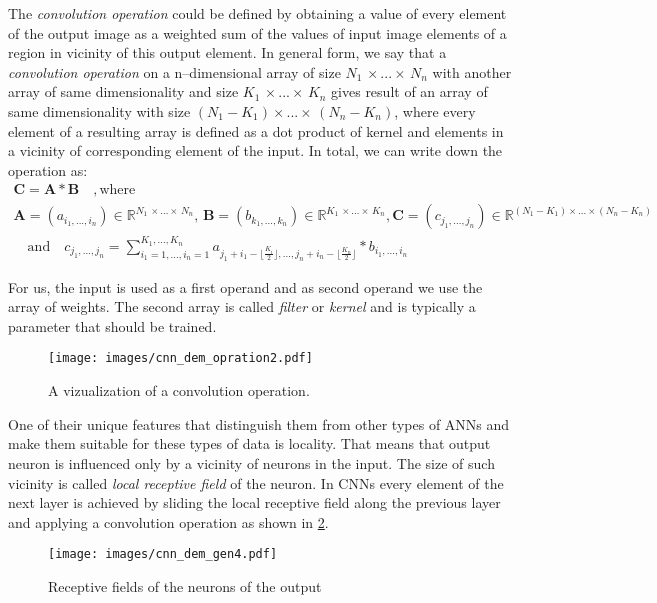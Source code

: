The \textit{convolution operation} could be defined by obtaining a value of every element of the output image as a weighted sum of the values of input image elements of a region in vicinity of this output element.
In general form, we say that a \emph{convolution operation} on a $\mathrm{n}$--dimensional array of size $N_{1} \, \times... \times \, N_{n}$ with another array of same dimensionality and size $K_{1} \, \times... \times \, K_{n} $ gives result of an array of same dimensionality with size $ (N_{1}-K_{1}) \times... \times \, (N_{n}-K_{n}) $, 
where every element of a resulting array is defined as a dot product of kernel and elements in a vicinity of corresponding element of the input.
In total, we can write down the operation as:
\begin{gather*}
\mathbf{C} = \mathbf{A} \ast \mathbf{B} \quad , \mathrm{where} \quad \\ \mathbf{A} = (a_{i_{1},...,i_{n}}) \in \mathbb{R}^{N_{1} \, \times... \times \, N_{n}} , \, \mathbf{B} = (b_{k_{1},...,k_{n}}) \in \mathbb{R}^{K_{1} \, \times... \times \, K_{n}},
\mathbf{C} = (c_{j_{1},...,j_{n}}) \in \mathbb{R}^{(N_{1}-K_{1}) \times... \times (N_{n}-K_{n})} \\ \quad \mathrm{and}
\quad c_{j_{1},...,j_{n}} = \sum_{i_{1}=1,...,i_{n}=1}^{K_{1},...,K_{n}} a_{j_{1}+i_{1}-\lfloor \frac{K_{i}}{2}\rfloor,...,j_{n}+i_{n}-\lfloor \frac{K_{n}}{2}\rfloor} \ast b_{i_{1},...,i_{n}}
\end{gather*}

For us, the input is used as a first operand and as second operand we use the array of weights.
The second array is called \emph{filter} or \emph{kernel} and is typically a parameter that should be trained. 
\medskip
\begin{figure}[ht]
	\centering
	\texttt{[image: images/cnn\_dem\_opration2.pdf]}
	\caption{A vizualization of a convolution operation.}
	\label{fig:convoper_demo}
\end{figure}
\medskip

One of their unique features that distinguish them from other types of ANNs and make them suitable for these types of data is locality.
That means that output neuron is influenced only by a vicinity of neurons in the input.
The size of such vicinity is called \emph{local receptive field} of the neuron.
In CNNs every element of the next layer is achieved by sliding the local receptive field along the previous layer and applying a convolution operation as shown in \ref{fig:rec_field_demo}.
\begin{figure}[ht]
	\centering
	\texttt{[image: images/cnn\_dem\_gen4.pdf]}
	\caption{Receptive fields of the neurons of the output}
	\label{fig:rec_field_demo}
\end{figure}

